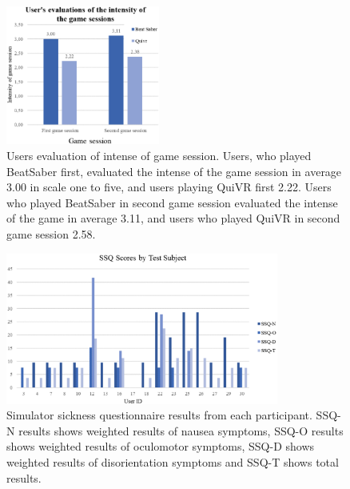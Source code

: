 \documentclass{sig-alternate-05-2015}
\begin{document}
\begin{figure}
    \centering
    \includegraphics[width=0.45\textwidth]{intensity_evaluation}
    \caption
        {
            Users evaluation of intense of game session. Users, who played BeatSaber 
            first, evaluated the intense of the game session in average 3.00 in scale 
            one to five, and users playing QuiVR first 2.22. Users who played BeatSaber 
            in second game session evaluated the intense of the game in average 3.11, 
            and users who played QuiVR in second game session 2.58.
        }
\end{figure}

\begin{figure}
    \centering
    \includegraphics[width=0.80\textwidth]{ssq}
    \caption
        {
            Simulator sickness questionnaire results from each participant. 
            SSQ-N results shows weighted results of nausea symptoms, SSQ-O 
            results shows weighted results of oculomotor symptoms, SSQ-D 
            shows weighted results of disorientation symptoms and SSQ-T 
            shows total results.
        }
\end{figure}
\end{document}
